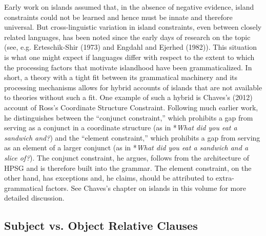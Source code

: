 \documentclass[a4paper]{article}
\begin{document}
\newline
\newline
Early work on islands assumed that, in the absence of negative evidence, island constraints could not be learned and hence must be innate and therefore universal.  But cross-linguistic variation in island constraints, even between closely related languages, has been noted since the early days of research on the topic (see, e.g. Erteschik-Shir (1973) and Engdahl and Ejerhed (1982)).
\newline
\newline
This situation is what one might expect if languages differ with respect to the extent to which the processing factors that motivate islandhood have been grammaticalized.  In short, a theory with a tight fit between its grammatical machinery and its processing mechanisms allows for hybrid accounts of islands that are not available to theories without such a fit.
\newline
\newline
One example of such a hybrid is Chaves's (2012) account of Ross's Coordinate Structure Constraint.  Following much earlier work, he distinguishes between the ``conjunct constraint,'' which prohibits a gap from serving as a conjunct in a coordinate structure (as in *{\it What did you eat a sandwich and?}) and the ``element constraint,'' which prohibits a gap from serving as an element of a larger conjunct (as in *{\it What did you eat a sandwich and a slice of?}).  The conjunct constraint, he argues, follows from the architecture of HPSG and is therefore built into the grammar.  The element constraint, on the other hand, has exceptions and, he claims, should be attributed to extra-grammatical factors.  See Chaves's chapter on islands in this volume for more detailed discussion. 

\subsection{Subject vs. Object Relative Clauses}
\end{document}

